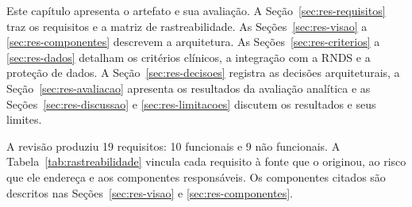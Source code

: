 \label{sec:resultados}

Este capítulo apresenta o artefato e sua avaliação. A Seção~\ref{sec:res-requisitos} traz os requisitos e a matriz de rastreabilidade. As Seções~\ref{sec:res-visao} a \ref{sec:res-componentes} descrevem a arquitetura. As Seções~\ref{sec:res-criterios} a \ref{sec:res-dados} detalham os critérios clínicos, a integração com a RNDS e a proteção de dados. A Seção~\ref{sec:res-decisoes} registra as decisões arquiteturais, a Seção~\ref{sec:res-avaliacao} apresenta os resultados da avaliação analítica e as Seções~\ref{sec:res-discussao} e \ref{sec:res-limitacoes} discutem os resultados e seus limites.

\label{sec:res-requisitos}

A revisão produziu 19 requisitos: 10 funcionais e 9 não funcionais. A Tabela~\ref{tab:rastreabilidade} vincula cada requisito à fonte que o originou, ao risco que ele endereça e aos componentes responsáveis. Os componentes citados são descritos nas Seções~\ref{sec:res-visao} e \ref{sec:res-componentes}.

